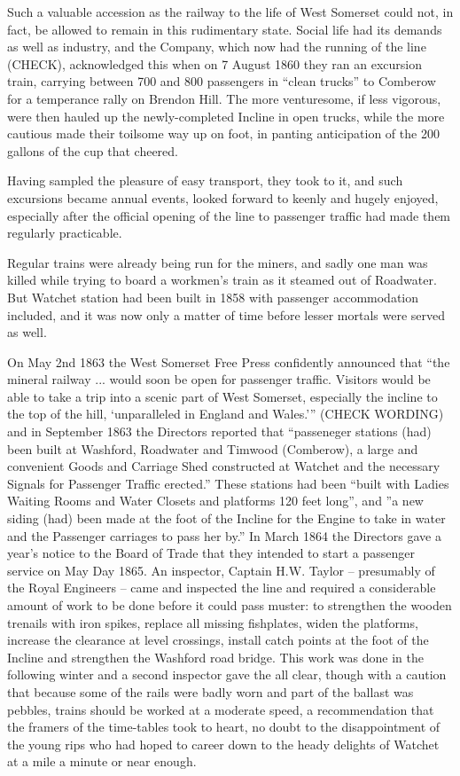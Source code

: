 \documentclass[10pt,a4paper]{article}
\begin{document}
Such a valuable accession as the railway to the life of West Somerset could not, in fact, be allowed to remain in this rudimentary state. Social life had its demands as well as industry, and the Company, which now had the running of the line (CHECK), acknowledged this when on 7 August 1860 they ran an excursion train, carrying between 700 and 800 passengers in “clean trucks”  to Comberow for a temperance rally on Brendon Hill. The more venturesome, if less vigorous, were then hauled up the newly-completed Incline in open trucks, while the more cautious made their toilsome way up on foot, in panting anticipation of the 200 gallons of the cup that cheered.

Having sampled the pleasure of easy transport, they took to it, and such excursions became annual events, looked forward to keenly and hugely enjoyed, especially after the official opening of the line to passenger traffic had made them regularly practicable.

Regular trains were already being run for the miners, and sadly one man was killed while trying to board a workmen’s train as it steamed out of Roadwater. But Watchet station had been built in 1858 with passenger accommodation included, and it was now only a matter of time before lesser mortals were served as well.  

On May 2nd 1863 the West Somerset Free Press confidently announced that “the mineral railway ... would soon be open for passenger traffic. Visitors would be able to take a trip into a scenic part of West Somerset, especially the incline to the top of the hill, ‘unparalleled in England and Wales.’” (CHECK WORDING) and in September 1863 the Directors reported that “passeneger stations (had) been built at Washford, Roadwater and Timwood (Comberow), a large and convenient Goods and Carriage Shed constructed at Watchet and the necessary Signals for Passenger Traffic erected.”  These stations had been “built with Ladies Waiting Rooms and Water Closets and platforms 120 feet long”, and ”a new siding (had) been made at the foot of the Incline for the Engine to take in water and the Passenger carriages to pass her by.”  In March 1864 the Directors gave a year’s notice to the Board of Trade that they intended to start a passenger service on May Day 1865.  An inspector, Captain H.W. Taylor – presumably of the Royal Engineers – came and inspected the line and required a considerable amount of work to be done before it could pass muster:  to strengthen the wooden trenails with iron spikes, replace all missing fishplates, widen the platforms, increase the clearance at level crossings, install catch points at the foot of the Incline and strengthen the Washford road bridge.  This work was done in the following winter and a second inspector gave the all clear, though with a caution that because some of the rails were badly worn and part of the ballast was pebbles, trains should be worked at a moderate speed, a recommendation that the framers of the time-tables took to heart, no doubt to the disappointment of the young rips who had hoped to career down to the heady delights of Watchet at a mile a minute or near enough.
\end{document}
